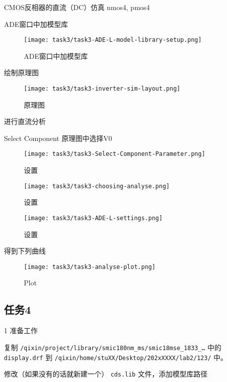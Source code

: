 \documentclass{theme-2614084}
\begin{document}
CMOS反相器的直流（DC）仿真  nmos4, pmos4

ADE窗口中加模型库

\begin{figure}[H]
  \centering
  \texttt{[image: task3/task3-ADE-L-model-library-setup.png]}
  \caption{ADE窗口中加模型库}
\end{figure}

绘制原理图

\begin{figure}[H]
  \centering
  \texttt{[image: task3/task3-inverter-sim-layout.png]}
  \caption{原理图}
\end{figure}

进行直流分析

Select Component 原理图中选择V0

\begin{figure}[htbp]
  \centering\begin{minipage}[t]{0.48\textwidth}
    \centering\texttt{[image: task3/task3-Select-Component-Parameter.png]}
    \caption{设置}
  \end{minipage}
  \centering\begin{minipage}[t]{0.48\textwidth}
    \centering\texttt{[image: task3/task3-choosing-analyse.png]}
    \caption{设置}
  \end{minipage}
\end{figure}

\begin{figure}[H]
  \centering
  \texttt{[image: task3/task3-ADE-L-settings.png]}
  \caption{设置}
\end{figure}

得到下列曲线

\begin{figure}[H]
  \centering
  \texttt{[image: task3/task3-analyse-plot.png]}
  \caption{Plot}
\end{figure}

\subsection{任务4}

1 准备工作

复制 \texttt{/qixin/project/library/smic180nm\_ms/smic18mse\_1833\_\dots} 中的 \texttt{display.drf} 到 
\texttt{/qixin/home/stuXX/Desktop/202xXXXX/lab2/123/} 中。

修改（如果没有的话就新建一个） \texttt{cds.lib} 文件，添加模型库路径
\end{document}
